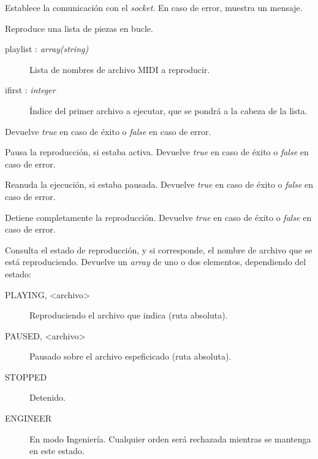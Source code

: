 \begin{description}[style=nextline]
	\item[driver ()]
	Establece la comunicación con el \textit{socket}. En caso de error, muestra un mensaje.
	
	\item[driver\_play (playlist, ifirst) : \textit{boolean}]
	Reproduce una lista de piezas en bucle.
	
	\begin{description}
		\item[playlist : \textit{array(string)}] Lista de nombres de archivo MIDI a reproducir.
		\item[ifirst : \textit{integer}] Índice del primer archivo a ejecutar, que se pondrá a la cabeza de la lista.
	\end{description}
	
	Devuelve \textit{true} en caso de éxito o \textit{false} en caso de error.
	
	\item[driver\_pause () : \textit{boolean}]
	Pausa la reproducción, si estaba activa. Devuelve \textit{true} en caso de éxito o \textit{false} en caso de error.
	
	\item[driver\_resume () : \textit{boolean}]
	Reanuda la ejecución, si estaba pausada. Devuelve \textit{true} en caso de éxito o \textit{false} en caso de error.
	
	\item[driver\_stop () : \textit{boolean}]
	Detiene completamente la reproducción. Devuelve \textit{true} en caso de éxito o \textit{false} en caso de error.
	
	\item[driver\_status () : \textit{array}]
	Consulta el estado de reproducción, y si corresponde, el nombre de archivo que se está reproduciendo. Devuelve un \textit{array} de uno o dos elementos, dependiendo del estado:
	
	\begin{description}
		\item[PLAYING, <archivo>] Reproduciendo el archivo que indica (ruta absoluta).
		\item[PAUSED, <archivo>] Pausado sobre el archivo espeficicado (ruta absoluta).
		\item[STOPPED] Detenido.
		\item[ENGINEER] En modo Ingeniería. Cualquier orden será rechazada mientras se mantenga en este estado.
	\end{description}
	
\end{description}

